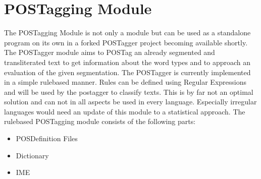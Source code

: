 \documentclass[10pt,a4paper,titlepage]{report}
\begin{document}
	\section{POSTagging Module}
	\label{sec:POSTagModule}
	The POSTagging Module is not only a module but can be used as a standalone program on its own in a forked POSTagger project becoming available shortly. The POSTagger module aims to POSTag an already segmented and transliterated text to get information about the word types and to approach an evaluation of the given segmentation. The POSTagger is currently implemented in a simple rulebased manner. Rules can be defined using Regular Expressions and will be used by the postagger to classify texts. This is by far not an optimal solution and can not in all aspects be used in every language. Especially irregular languages would need an update of this module to a statistical approach.
	The rulebased POSTagging module consists of the following parts:
	\begin{itemize}
		\item POSDefinition Files
		\item Dictionary
		\item IME
	\end{itemize}
\end{document}
